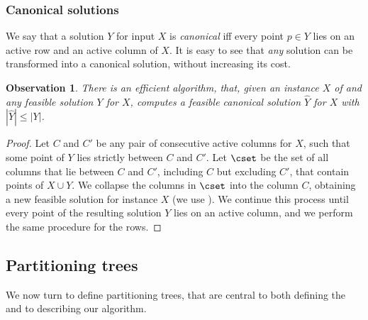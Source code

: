 \documentclass{toc}
\newtheorem{myobs}[theorem]{Observation}
\begin{document}
%



\subsubsection{Canonical solutions} 
We say that a solution $Y$ for input $X$ is \emph{canonical} iff every point $p\in Y$ lies on an active row and an active column of $X$. %
%
It is easy to see that \emph{any} solution can be transformed into a canonical solution, without increasing its cost. %

\begin{myobs} \label{obs: canonical solutions} There is an efficient algorithm, that, given an instance $X$ of \minsat and
	 any feasible solution $Y$ for $X$, computes a feasible canonical solution $\hat{Y}$ for $X$ with $|\hat{Y}| \leq |Y|$.  %
\end{myobs} 
\begin{proof}
Let $C$ and $C'$ be any pair of consecutive active columns for $X$, such that some point of $Y$ lies strictly between $C$ and $C'$. Let $\cset$ be the set of all columns that lie between $C$ and $C'$, including $C$ but excluding $C'$, that contain points of $X\cup Y$. We collapse the columns in $\cset$ into the column $C$, obtaining a new feasible solution for instance $X$ (we use ). We continue this process until every point of the resulting solution $Y$ lies on an active column, and we perform the same procedure for the rows.
\end{proof}

\subsection{Partitioning trees}

We now turn to define partitioning trees, that are central to both defining the \WBone and to describing our algorithm.
\end{document}
